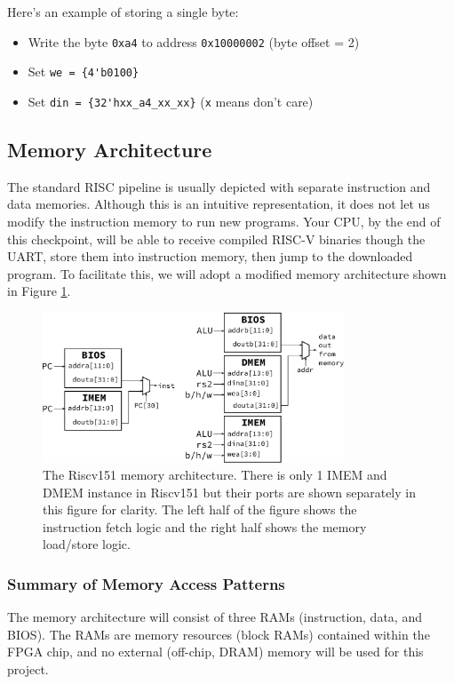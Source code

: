 \documentclass[11pt]{article}
\begin{document}
Here's an example of storing a single byte:
\begin{itemize}
  \item Write the byte \verb|0xa4| to address \verb|0x10000002| (byte offset = 2)
  \item Set \verb|we = {4'b0100}|
  \item Set \verb|din = {32'hxx_a4_xx_xx}| (\verb|x| means don't care)
\end{itemize}

\subsection{Memory Architecture}
The standard RISC pipeline is usually depicted with separate instruction and data memories.
Although this is an intuitive representation, it does not let us modify the instruction memory to run new programs.
Your CPU, by the end of this checkpoint, will be able to receive compiled RISC-V binaries though the UART, store them into instruction memory, then jump to the downloaded program.
To facilitate this, we will adopt a modified memory architecture shown in Figure \ref{fig:mem_arch}.

\begin{figure}[hbt]
  \begin{center}
    \includegraphics[width=0.8\textwidth]{memory_arch.pdf}
    \caption{The Riscv151 memory architecture. There is only 1 IMEM and DMEM instance in Riscv151 but their ports are shown separately in this figure for clarity. The left half of the figure shows the instruction fetch logic and the right half shows the memory load/store logic.}
    \label{fig:mem_arch}
  \end{center}
\end{figure}

\subsubsection{Summary of Memory Access Patterns}
The memory architecture will consist of three RAMs (instruction, data, and BIOS).
The RAMs are memory resources (block RAMs) contained within the FPGA chip, and no external (off-chip, DRAM) memory will be used for this project.
\end{document}
